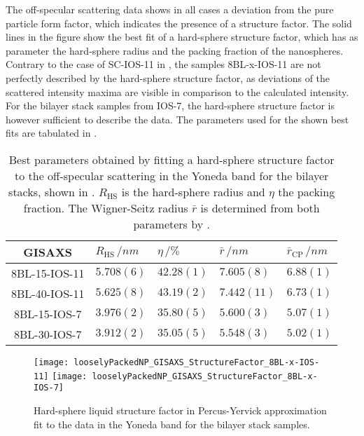 \documentclass[\main/dresen_thesis.tex]{subfiles}
\begin{document}
  The off-specular scattering data shows in all cases a deviation from the pure particle form factor, which indicates the presence of a structure factor.
  The solid lines in the figure show the best fit of a hard-sphere structure factor, which has as parameter the hard-sphere radius and the packing fraction of the nanospheres.
  Contrary to the case of SC-IOS-11 in , the samples 8BL-x-IOS-11 are not perfectly described by the hard-sphere structure factor, as deviations of the scattered intensity maxima are visible in comparison to the calculated intensity.
  For the bilayer stack samples from IOS-7, the hard-sphere structure factor is however sufficient to describe the data.
  The parameters used for the shown best fits are tabulated in .

  \begin{table}[tb]
    \centering
    \caption{\label{tab:looselyPackedNP:bilayerStacks:gisaxs}Best parameters obtained by fitting a hard-sphere structure factor to the off-specular scattering in the Yoneda band for the bilayer stacks, shown in . $R_\mathrm{HS}$ is the hard-sphere radius and $\eta$ the packing fraction. The Wigner-Seitz radius $\bar{r}$ is determined from both parameters by .}
    \begin{tabular}{ c | l | l | l | l }
      \rule{0pt}{2ex} \textbf{GISAXS}  & $R_\mathrm{HS} \, / \unit{nm}$ &$\eta \, / \unit{\%}$ & $\bar{r} \, / \unit{nm}$ & $\bar{r}_\mathrm{CP} \, / \unit{nm}$ \\
      \hline
      \rule{0pt}{2ex} 8BL-15-IOS-11    & $5.708(6)$    & $42.28(1)$ & $7.605(8)$  & $6.88(1)$\\
      \rule{0pt}{2ex} 8BL-40-IOS-11    & $5.625(8)$    & $43.19(2)$ & $7.442(11)$ & $6.73(1)$\\
      \rule{0pt}{2ex} 8BL-15-IOS-7     & $3.976(2)$    & $35.80(5)$ & $5.600(3)$  & $5.07(1)$\\
      \rule{0pt}{2ex} 8BL-30-IOS-7     & $3.912(2)$    & $35.05(5)$ & $5.548(3)$  & $5.02(1)$\\
      \hline
    \end{tabular}
  \end{table}

  \begin{figure}[tb]
    \centering
    \texttt{[image: looselyPackedNP\_GISAXS\_StructureFactor\_8BL-x-IOS-11]}
    \texttt{[image: looselyPackedNP\_GISAXS\_StructureFactor\_8BL-x-IOS-7]}
    \caption{\label{fig:looselyPackedNP:bilayerStacks:gisaxsHardSphereSF}Hard-sphere liquid structure factor in Percus-Yervick approximation fit to the data in the Yoneda band for the bilayer stack samples.}
  \end{figure}
\end{document}
